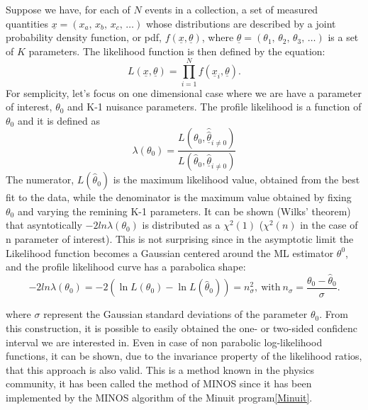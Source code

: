 \documentclass[11pt]{article}
\begin{document}
Suppose we have, for each of $N$ events in a collection, a set of
measured quantities \mbox{$\underline{x}=(x_a,\,x_b,\,x_c,\,\ldots)$}
whose distributions are described by a joint probability density
function, or pdf, $f(\underline{x},\underline{\theta})$, where
$\underline{\theta}=(\theta_1,\,\theta_2,\,\theta_3,\,\ldots )$ is a
set of $K$ parameters. The likelihood function is then defined by
the equation:
\begin{equation}
    \label{likelihood}
    L(\underline{x},\underline{\theta})=\prod^{N}_{i=1}f({\underline{x}}_{i},\underline{\theta}).
\end{equation}
For semplicity, let's focus on one dimensional case where  we are have
a parameter of interest,  $\theta_{0}$ and K-1 nuisance parameters. 
The profile likelihood is a function of $\theta_{0}$ and it is defined as 
\begin{equation}
    \label{profile_likelihood}
\lambda(\theta_{0} ) = \frac{
  L(\theta_{0},\hat{\hat{\underline{\theta} } }_{i \neq 0}
     ) } 
{  L(\hat{\theta}_{0}, \hat{\underline{\theta}}_{i \neq
      0}   ) }
\end{equation}
The numerator, $ L(\hat{\theta}_{0} )$ is the maximum likelihood value,
obtained from the best fit to the data, while the denominator is the
maximum value obtained by fixing $\theta_{0}$ and varying the remining
K-1 parameters.   
It can be shown (Wilks' theorem) that asyntotically
$-2ln\lambda(\theta_0)$ is distributed as a $\chi^2(1)$ ($\chi^2(n)$
in the case of n parameter of interest). This is not
surprising since in the asymptotic limit the Likelihood function
becomes a Gaussian centered around the ML estimator $\theta^0$, and
the profile likelihood curve has a parabolica shape: 
\begin{equation}
    \label{parabolicnll}
-2ln\lambda(\theta_0) = -2 (\ln{L(\theta_0)}-\ln{L(\hat{\theta}_0)}) = n_{\sigma}^{2},\ \mathrm{with}\ n_\sigma=\frac{\theta_{0}-\hat{\theta}_{0}}{\sigma}. 
\end{equation}

where $\sigma$ represent the Gaussian standard deviations of the
parameter $\theta_{0}$. From this construction, it is possible to
easily obtained the one- or two-sided confidenc interval we are
interested in. Even in case of non parabolic log-likelihood
functions, it can be shown, due to the invariance property of the
likelihood ratios, that this approach is also valid. This is a
method known in the physics community, it has been called the method
of MINOS since it  has been implemented by the MINOS algorithm of the Minuit
program\ref{Minuit}. 
\end{document}
